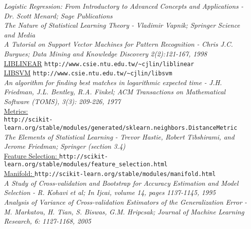\documentclass[12pt]{article}
\begin{document}
\textit{Logistic Regression: From Introductory to Advanced Concepts and Applications - Dr. Scott Menard; Sage Publications}\\

\textit{The Nature of Statistical Learning Theory - Vladimir Vapnik; Springer Science and Media}\\

\textit{A Tutorial on Support Vector Machines for Pattern Recognition - Chris J.C. Burgues; Data Mining and Knowledge Discovery 2(2):121-167, 1998}\\

\href{http://www.csie.ntu.edu.tw/~cjlin/liblinear}{LIBLINEAR} \verb+http://www.csie.ntu.edu.tw/~cjlin/liblinear+ \\

\href{http://www.csie.ntu.edu.tw/~cjlin/libsvm}{LIBSVM} \verb+http://www.csie.ntu.edu.tw/~cjlin/libsvm+ \\

\textit{An algorithm for finding best matches in logarithmic expected time - J.H. Friedman, J.L. Bentley, R.A. Finkel; ACM Transactions on Mathematical Software (TOMS), 3(3): 209-226, 1977}\\

\href{http://scikit-learn.org/stable/modules/generated/sklearn.neighbors.DistanceMetric}{Metrics: }\\ \verb+http://scikit-learn.org/stable/modules/generated/sklearn.neighbors.DistanceMetric+ \\

\textit{The Elements of Statistical Learning - Trevor Hastie, Robert Tibshirami, and Jerome Friedman; Springer (section 3.4)}\\

\href{http://scikit-learn.org/stable/modules/feature_selection.html}{Feature Selection: }\verb+http://scikit-learn.org/stable/modules/feature_selection.html+ \\

\href{http://scikit-learn.org/stable/modules/manifold.html}{Manifold: }\verb+http://scikit-learn.org/stable/modules/manifold.html+ \\

\textit{A Study of Cross-validation and Bootstrap for Accuracy Estimation and Model Selection - R. Kohavi et al; In Ijcai, volume 14, pages 1137-1145, 1995}\\

\textit{Analysis of Variance of Cross-validation Estimators of the Generalization Error - M. Markatou, H. Tian, S. Biswas, G.M. Hripcsak; Journal of Machine Learning Research, 6: 1127-1168, 2005}\\
\end{document}
